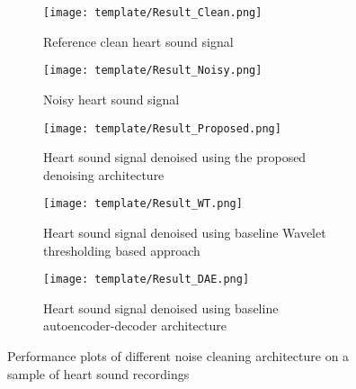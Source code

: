 \documentclass[sigconf,screen]{acmart}
\begin{document}
\begin{figure}
	\begin{subfigure}{.48\textwidth}
	\centering
	\texttt{[image: template/Result\_Clean.png]}
	\caption{Reference clean heart sound signal}
	\label{fig:Result_Clean}
\end{subfigure}
	\begin{subfigure}{.48\textwidth}
	\centering
	\texttt{[image: template/Result\_Noisy.png]}
	\caption{Noisy heart sound signal}
	\label{fig:Result_Noisy}
\end{subfigure}
	\begin{subfigure}{.48\textwidth}
		\centering
		\texttt{[image: template/Result\_Proposed.png]}
		\caption{Heart sound signal denoised using the proposed denoising architecture}
		\label{fig:Result_Proposed}
	\end{subfigure}
	\begin{subfigure}{.48\textwidth}
	\centering
 	\texttt{[image: template/Result\_WT.png]}
	\caption{Heart sound signal denoised using baseline Wavelet thresholding based approach }
	\label{fig:Result_WT}
	\texttt{[image: template/Result\_DAE.png]}
	\caption{Heart sound signal denoised using baseline autoencoder-decoder architecture}
	\label{fig:Result_DAE}
\end{subfigure}
\caption{Performance plots of different noise cleaning architecture on a sample of heart sound recordings}
\label{fig:fig}
\end{figure}
\end{document}

